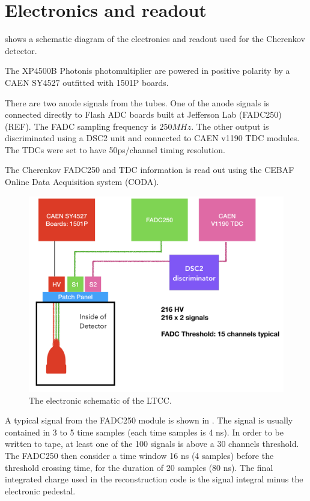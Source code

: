 \section{Electronics and readout}

 shows a schematic diagram of the electronics and readout used for the Cherenkov detector.

The XP4500B Photonis photomultiplier are powered in positive polarity by a CAEN SY4527 outfitted with 1501P boards.

There are two anode signals from the tubes. One of the anode signals is connected directly to Flash ADC
boards built at Jefferson Lab (FADC250)(REF). The FADC sampling frequency is $250 MHz$. The other output is discriminated using a DSC2 unit and connected to CAEN v1190 TDC modules.
The TDCs were set to have 50ps/channel timing resolution.

The Cherenkov FADC250 and TDC information is read out using the CEBAF Online Data Acquisition system (CODA).

\begin{figure}
	\centering
	\includegraphics[width=0.95\columnwidth,keepaspectratio]{img/electronicScheme.png}
	\caption{The electronic schematic of the LTCC.}
	\label{fig:electronicScheme}
\end{figure}





A typical signal from the FADC250 module is shown in . The signal is usually contained in 3 to 5 time samples (each time samples is 4 ns).
In order to be written to tape, at least one of the 100 signals is above a 30 channels threshold. The FADC250 then consider a time window 16 ns (4 samples)
before the threshold crossing time, for the duration of 20 samples (80 ns). The final integrated charge used in the reconstruction code is the signal integral
minus the electronic pedestal.



